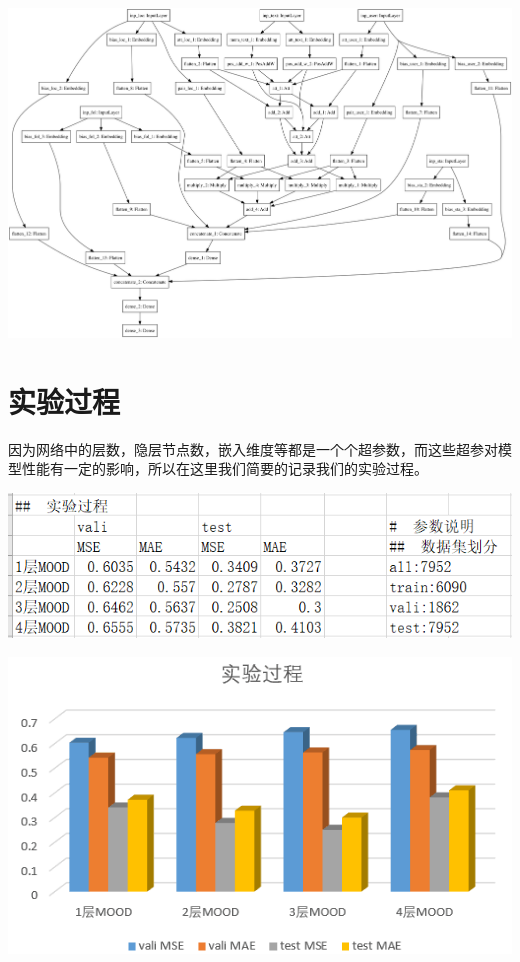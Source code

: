 \documentclass[a4paper, 12pt]{ctexart}
\begin{document}
\includegraphics[width=6inc]{tweet_pics/model_noshape}

\section{实验过程}
因为网络中的层数，隐层节点数，嵌入维度等都是一个个超参数，而这些超参对模型性能有一定的影响，所以在这里我们简要的记录我们的实验过程。

\includegraphics[width=6inc]{tweet_pics/tb}

\includegraphics[width=6inc]{tweet_pics/graph}
\end{document}
